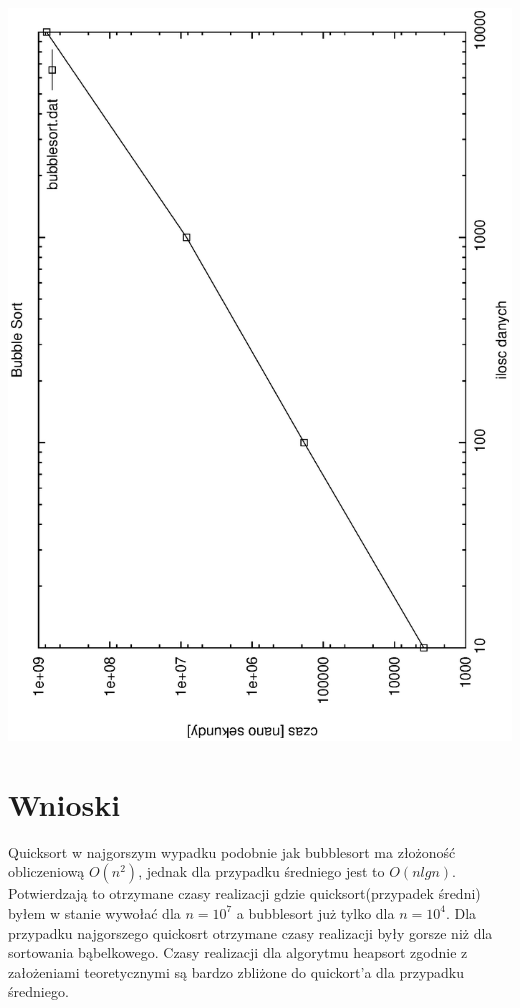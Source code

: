 \documentclass[a4paper,11pt]{report}
\begin{document}
\includegraphics[angle=270, scale = 0.5]{wykresy/bubblesort.eps}



\chapter{Wnioski}
Quicksort w najgorszym wypadku podobnie jak bubblesort ma złożoność obliczeniową $O(n^{2})$, jednak dla przypadku średniego jest to $O(n lgn)$. Potwierdzają to otrzymane czasy realizacji gdzie quicksort(przypadek średni) byłem w stanie wywołać dla $n=10^{7}$ a bubblesort już tylko dla $n=10^{4}$. Dla przypadku najgorszego quickosrt otrzymane czasy realizacji były gorsze niż dla sortowania bąbelkowego. Czasy realizacji dla algorytmu heapsort zgodnie z założeniami teoretycznymi są bardzo zbliżone do quickort'a dla przypadku średniego.
\end{document}
